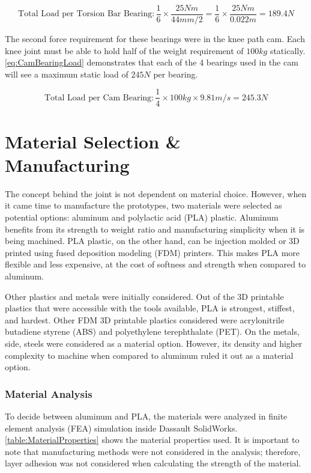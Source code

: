 \begin{equation}
    \text{Total Load per Torsion Bar Bearing}: \frac{1}{6} \times \frac{25Nm}{44mm / 2} = \frac{1}{6} \times \frac{25Nm}{0.022m} = 189.4N
    \label{eq:TorsionBearingLoad}
\end{equation}

The second force requirement for these bearings were in the knee path cam. Each knee joint must be able to hold half of the weight requirement of \(100kg\) statically. \autoref{eq:CamBearingLoad} demonstrates that each of the 4 bearings used in the cam will see a maximum static load of \(245N\) per bearing.

\begin{equation}
    \text{Total Load per Cam Bearing}: \frac{1}{4} \times 100kg \times 9.81m/s = 245.3N
    \label{eq:CamBearingLoad}
\end{equation}

\section{Material Selection \& Manufacturing}

The concept behind the joint is not dependent on material choice. However, when it came time to manufacture the prototypes, two materials were selected as potential options: aluminum and polylactic acid (PLA) plastic. Aluminum benefits from its strength to weight ratio and manufacturing simplicity when it is being machined. PLA plastic, on the other hand, can be injection molded or 3D printed using fused deposition modeling (FDM) printers. This makes PLA more flexible and less expensive, at the cost of softness and strength when compared to aluminum.

Other plastics and metals were initially considered. Out of the 3D printable plastics that were accessible with the tools available, PLA is strongest, stiffest, and hardest. Other FDM 3D printable plastics considered were  acrylonitrile butadiene styrene (ABS) and polyethylene terephthalate (PET). On the metals, side, steels were considered as a material option. However, its density and higher complexity to machine when compared to aluminum ruled it out as a material option.

\subsubsection{Material Analysis}
To decide between aluminum and PLA, the materials were analyzed in finite element analysis (FEA) simulation inside Dassault SolidWorks. \autoref{table:MaterialProperties} shows the material properties used. It is important to note that manufacturing methods were not considered in the analysis; therefore, layer adhesion was not considered when calculating the strength of the material.

